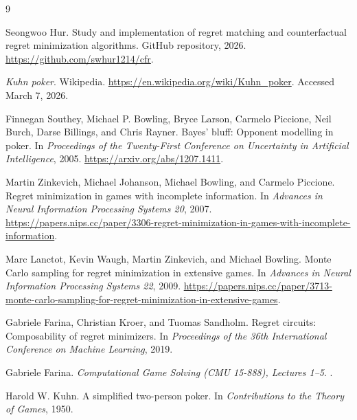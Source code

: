 \documentclass[11pt,reqno,twoside]{article}
\theoremstyle{myThm}
\theoremstyle{myRem}
\theoremstyle{myDef}
\numberwithin{equation}{section}
\begin{document}
\sloppy

\begin{thebibliography}{9}

Seongwoo Hur.
\newblock Study and implementation of regret matching and counterfactual
regret minimization algorithms.
\newblock GitHub repository, 2026.
\newblock \url{https://github.com/swhur1214/cfr}.

\emph{Kuhn poker}.
\newblock Wikipedia.
\newblock \url{https://en.wikipedia.org/wiki/Kuhn_poker}.
\newblock Accessed March 7, 2026.

Finnegan Southey, Michael P. Bowling, Bryce Larson, Carmelo Piccione,
Neil Burch, Darse Billings, and Chris Rayner.
\newblock Bayes' bluff: Opponent modelling in poker.
\newblock In \emph{Proceedings of the Twenty-First Conference on Uncertainty
in Artificial Intelligence}, 2005.
\newblock \url{https://arxiv.org/abs/1207.1411}.

Martin Zinkevich, Michael Johanson, Michael Bowling, and Carmelo Piccione.
\newblock Regret minimization in games with incomplete information.
\newblock In \emph{Advances in Neural Information Processing Systems 20}, 2007.
\newblock \url{https://papers.nips.cc/paper/3306-regret-minimization-in-games-with-incomplete-information}.

Marc Lanctot, Kevin Waugh, Martin Zinkevich, and Michael Bowling.
\newblock Monte Carlo sampling for regret minimization in extensive games.
\newblock In \emph{Advances in Neural Information Processing Systems 22}, 2009.
\newblock \url{https://papers.nips.cc/paper/3713-monte-carlo-sampling-for-regret-minimization-in-extensive-games}.

Gabriele Farina, Christian Kroer, and Tuomas Sandholm.
\newblock Regret circuits: Composability of regret minimizers.
\newblock In \emph{Proceedings of the 36th International Conference on
Machine Learning}, 2019.

Gabriele Farina.
\newblock \emph{Computational Game Solving (CMU 15-888), Lectures 1--5}.
.

Harold W. Kuhn.
\newblock A simplified two-person poker.
\newblock In \emph{Contributions to the Theory of Games}, 1950.

\end{thebibliography}
\end{document}
